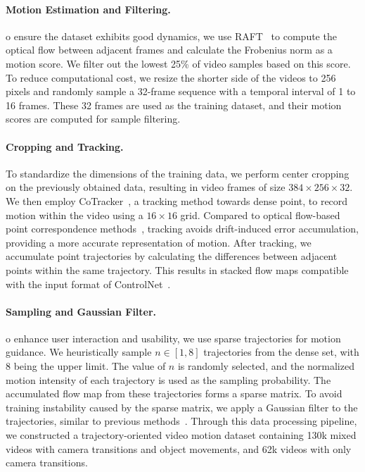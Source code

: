 \documentclass{article} %
\begin{document}
\paragraph{Motion Estimation and Filtering.}
o ensure the dataset exhibits good dynamics, we use RAFT~\citep{teed2020raft} to compute the optical flow between adjacent frames and calculate the Frobenius norm as a motion score. We filter out the lowest 25\% of video samples based on this score. To reduce computational cost, we resize the shorter side of the videos to 256 pixels and randomly sample a 32-frame sequence with a temporal interval of 1 to 16 frames. These 32 frames are used as the training dataset, and their motion scores are computed for sample filtering.



\paragraph{Cropping and Tracking.}
To standardize the dimensions of the training data, we perform center cropping on the previously obtained data, resulting in video frames of size $384\times256\times32$. We then employ CoTracker~\citep{karaev2023cotracker}, a tracking method towards dense point, to record motion within the video using a $16\times16$ grid. 
Compared to optical flow-based point correspondence methods~\citep{teed2020raft, xu2022gmflow}, tracking avoids drift-induced error accumulation, providing a more accurate representation of motion. 
After tracking, we accumulate point trajectories by calculating the differences between adjacent points within the same trajectory. This results in stacked flow maps compatible with the input format of ControlNet~\citep{zhang2023adding}.

\paragraph{Sampling and Gaussian Filter.}
o enhance user interaction and usability, we use sparse trajectories for motion guidance. We heuristically sample   $n\in[1,8]$  trajectories from the dense set, with 8 being the upper limit. The value of  $n$ is randomly selected, and the normalized motion intensity of each trajectory is used as the sampling probability. The accumulated flow map from these trajectories forms a sparse matrix. 
To avoid training instability caused by the sparse matrix, we apply a Gaussian filter to the trajectories, similar to previous methods~\citep{yin2023dragnuwa, wang2023motionctrl, wu2024draganything}. Through this data processing pipeline, we constructed a trajectory-oriented video motion dataset containing 
130k mixed videos with camera transitions and object movements, and 
62k videos with only camera transitions.
\end{document}

